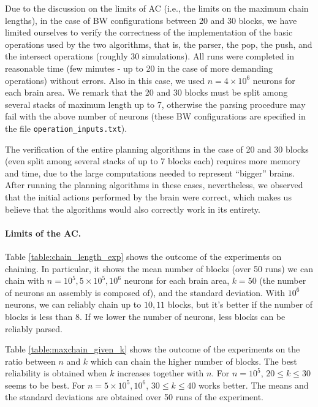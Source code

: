 \documentclass[letterpaper]{article}
\begin{document}
Due to the discussion on the limits of AC (i.e., the limits on the maximum chain lengths), in the case of BW configurations between 20 and 30 blocks, we have limited ourselves to verify the correctness of the implementation of the basic operations used by the two algorithms, that is, the parser, the pop, the push, and the intersect operations (roughly 30 simulations). All runs were completed in reasonable time (few minutes - up to 20 in the case of more demanding operations) without errors. Also in this case, we used $n=4\times 10^6$ neurons for each brain area. We remark that the 20 and 30 blocks must be split among several stacks of maximum length up to 7, otherwise the parsing procedure may fail with the above number of neurons (these BW configurations are specified in the file \texttt{operation\_inputs.txt}).

The verification of the entire planning algorithms in the case of 20 and 30 blocks (even split among several stacks of up to 7 blocks each) requires more memory and time, due to the large computations needed to represent ``bigger'' brains. After running the planning algorithms in these cases, nevertheless, we observed that the initial actions performed by the brain were correct, which makes us believe that the algorithms would also correctly work in its entirety. 

\paragraph{Limits of the AC.}
Table \ref{table:chain_length_exp} shows the outcome of the experiments on chaining. In particular, it shows the mean number of blocks (over 50 runs) we can chain with $n = 10^5, 5 \times 10^5, 10^6$ neurons for each brain area, $k = 50$ (the number of neurons an assembly is composed of), and the standard deviation. With $10^6$ neurons, we can reliably chain up to $10,11$ blocks, but it's better if the number of blocks is less than 8. If we lower the number of neurons, less blocks can be reliably parsed.

Table \ref{table:maxchain_given_k} shows the outcome of the experiments on the ratio between $n$ and $k$ which can chain the higher number of blocks. The best reliability is obtained when $k$ increases together with $n$. For $n=10^5$, $20 \le k \le 30$ seems to be best. For $n = 5 \times 10^5 , 10^6$, $30\le k \le 40$ works better. The means and the standard deviations are obtained over 50 runs of the experiment.
\end{document}
